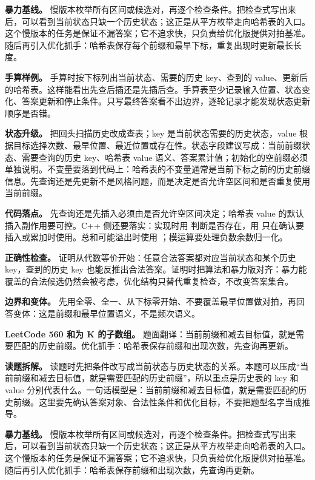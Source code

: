 \textbf{暴力基线。} 慢版本枚举所有区间或候选对，再逐个检查条件。把检查式写出来后，可以看到当前状态只缺一个历史状态；这正是从平方枚举走向哈希表的入口。这个慢版本的任务是保证不漏答案；它不追求快，只负责给优化版提供对拍基准。随后再引入优化抓手：哈希表保存每个前缀和最早下标，重复出现时更新最长长度。

\textbf{手算样例。} 手算时按下标列出当前状态、需要的历史 key、查到的 value、更新后的哈希表。这样能看出先查后插还是先插后查。手算表至少记录输入位置、状态变化、答案更新和停止条件。只写最终答案看不出边界，逐轮记录才能发现状态更新顺序是否错。

\textbf{状态升级。} 把回头扫描历史改成查表；key 是当前状态需要的历史状态，value 根据目标选择次数、最早位置、最近位置或存在性。状态字段建议写成：当前前缀状态、需要查询的历史 key、哈希表 value 语义、答案累计值；初始化的空前缀必须单独说明。不变量要落到代码上：哈希表的不变量通常是当前下标之前的历史前缀信息。先查询还是先更新不是风格问题，而是决定是否允许空区间和是否重复使用当前前缀。

\textbf{代码落点。} 先查询还是先插入必须由是否允许空区间决定；哈希表 value 的默认插入副作用要可控。C++ 侧还要落实：实现时用  判断是否存在，用  只在确认要插入或累加时使用。总和可能溢出时使用 ；模运算要处理负数余数归一化。

\textbf{正确性检查。} 证明从代数等价开始：任意合法答案都对应当前状态和某个历史 key，查到的历史 key 也能反推出合法答案。证明时把算法和暴力版对齐：暴力能覆盖的合法候选仍然会被考虑，优化结构只替代重复检查，不改变答案集合。

\textbf{边界和变体。} 先用全零、全一、从下标零开始、不要覆盖最早位置做对拍，再回答变体：这是前缀和最早位置语义，不是频次语义。

\noindent\textbf{LeetCode 560 和为 K 的子数组。} 题面翻译：当前前缀和减去目标值，就是需要匹配的历史前缀。优化抓手：哈希表保存前缀和出现次数，先查询再更新。

\textbf{读题拆解。} 读题时先把条件改写成当前状态与历史状态的关系。本题可以压成“当前前缀和减去目标值，就是需要匹配的历史前缀”，所以重点是历史表的 key 和 value 分别代表什么。一句话模型是：当前前缀和减去目标值，就是需要匹配的历史前缀。这里要先确认答案对象、合法性条件和优化目标，不要把题型名字当成推导。

\textbf{暴力基线。} 慢版本枚举所有区间或候选对，再逐个检查条件。把检查式写出来后，可以看到当前状态只缺一个历史状态；这正是从平方枚举走向哈希表的入口。这个慢版本的任务是保证不漏答案；它不追求快，只负责给优化版提供对拍基准。随后再引入优化抓手：哈希表保存前缀和出现次数，先查询再更新。


